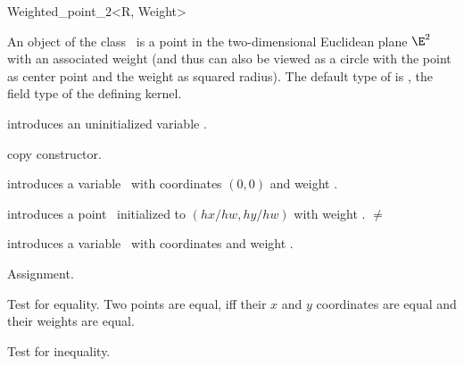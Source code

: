 \begin{ccRefClass} {Weighted_point_2<R, Weight>}

\ccDefinition
An object of the class \ccRefName\ is a point in the two-dimensional
Euclidean plane $\E^2$ with an associated weight (and thus can also
be viewed as a circle with the point as center point and the weight
as squared radius).  The default type of  is , the
field type of the defining kernel.

\ccInheritsFrom
{}

\ccTypes


\ccCreation
{}

\ccHidden {}
             {introduces an uninitialized variable \ccVar.}

\ccHidden {}
 	    {copy constructor.}

            {introduces a variable \ccVar\ with  
             coordinates $(0,0)$ and weight .}

            {introduces a point \ccVar\ initialized to $(hx/hw,hy/hw)$ with 
             weight .
	     \ccPrecond {} $\neq$  }

            {introduces a variable \ccVar\ with  
             coordinates  and weight .}


\ccOperations

\ccHidden 
{}
        {Assignment.}

       {Test for equality. Two points are equal, iff their $x$ and $y$ 
        coordinates are equal and their weights are equal.}

       {Test for inequality.}


\end{ccRefClass}
